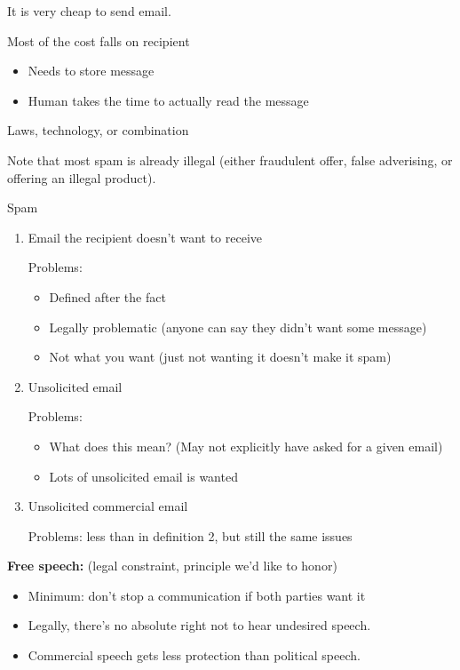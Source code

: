 It is very cheap to send email.

Most of the cost falls on recipient
\begin{itemize}
    \item Needs to store message
    \item Human takes the time to actually read the message
\end{itemize}

Laws, technology, or combination

Note that most spam is already illegal (either fraudulent offer, false adverising, or offering an illegal product).

\begin{definition}{Spam}
\begin{enumerate}
    \item Email the recipient doesn't want to receive

        Problems:
        \begin{itemize}
            \item Defined after the fact
            \item Legally problematic (anyone can say they didn't want some message)
            \item Not what you want (just not wanting it doesn't make it spam)
        \end{itemize}
    \item Unsolicited email

        Problems:
        \begin{itemize}
            \item What does this mean? (May not explicitly have asked for a given email)
            \item Lots of unsolicited email is wanted
        \end{itemize}
    \item Unsolicited commercial email

        Problems: less than in definition 2, but still the same issues
\end{enumerate}
\end{definition}

{\bf Free speech:} (legal constraint, principle we'd like to honor)
\begin{itemize}
    \item Minimum: don't stop a communication if both parties want it
    \item Legally, there's no absolute right not to hear undesired speech.
    \item Commercial speech gets less protection than political speech.
\end{itemize}

